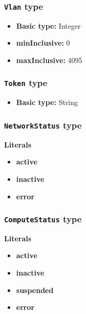 \subsubsection{\texttt{Vlan} type}

\begin{itemize}
\item \textbf{Basic type:} Integer
	\item \textbf{minInclusive:} 0
	\item \textbf{maxInclusive:} 4095
\end{itemize}
\subsubsection{\texttt{Token} type}

\begin{itemize}
\item \textbf{Basic type:} String
\end{itemize}
\subsubsection{\texttt{NetworkStatus} type}

\textbf{Literals}
\begin{itemize}
\item \textbf{active} 
\end{itemize}
\begin{itemize}
\item \textbf{inactive} 
\end{itemize}
\begin{itemize}
\item \textbf{error} 
\end{itemize}

\subsubsection{\texttt{ComputeStatus} type}

\textbf{Literals}
\begin{itemize}
\item \textbf{active} 
\end{itemize}
\begin{itemize}
\item \textbf{inactive} 
\end{itemize}
\begin{itemize}
\item \textbf{suspended} 
\end{itemize}
\begin{itemize}
\item \textbf{error} 
\end{itemize}

